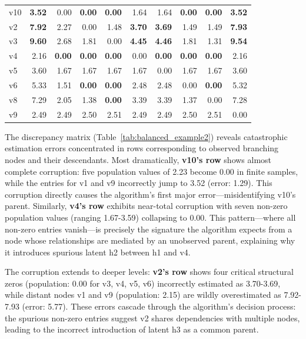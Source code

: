 \documentclass[11pt,a4paper]{article}
\numberwithin{equation}{section}
\begin{document}
\begin{table}[h]
\begin{tabular}{l|rrrrrrrrr}
v10 & \textbf{3.52} & 0.00 & \textbf{0.00} & \textbf{0.00} & 1.64 & 1.64 & \textbf{0.00} & \textbf{0.00} & \textbf{3.52} \\
v2 & \textbf{7.92} & 2.27 & 0.00 & 1.48 & \textbf{3.70} & \textbf{3.69} & 1.49 & 1.49 & \textbf{7.93} \\
v3 & \textbf{9.60} & 2.68 & 1.81 & 0.00 & \textbf{4.45} & \textbf{4.46} & 1.81 & 1.31 & \textbf{9.54} \\
v4 & 2.16 & \textbf{0.00} & \textbf{0.00} & \textbf{0.00} & 0.00 & \textbf{0.00} & \textbf{0.00} & \textbf{0.00} & 2.16 \\
v5 & 3.60 & 1.67 & 1.67 & 1.67 & 1.67 & 0.00 & 1.67 & 1.67 & 3.60 \\
v6 & 5.33 & 1.51 & \textbf{0.00} & \textbf{0.00} & 2.48 & 2.48 & 0.00 & \textbf{0.00} & 5.32 \\
v8 & 7.29 & 2.05 & 1.38 & \textbf{0.00} & 3.39 & 3.39 & 1.37 & 0.00 & 7.28 \\
v9 & 2.49 & 2.49 & 2.50 & 2.51 & 2.49 & 2.49 & 2.50 & 2.51 & 0.00 \\
\bottomrule
\end{tabular}
\end{table}

The discrepancy matrix (Table~\ref{tab:balanced_example2}) reveals catastrophic estimation errors concentrated in rows corresponding to observed branching nodes and their descendants. Most dramatically, \textbf{v10's row} shows almost complete corruption: five population values of 2.23 become 0.00 in finite samples, while the entries for v1 and v9 incorrectly jump to 3.52 (error: 1.29). This corruption directly causes the algorithm's first major error—misidentifying v10's parent. Similarly, \textbf{v4's row} exhibits near-total corruption with seven non-zero population values (ranging 1.67-3.59) collapsing to 0.00. This pattern—where all non-zero entries vanish—is precisely the signature the algorithm expects from a node whose relationships are mediated by an unobserved parent, explaining why it introduces spurious latent h2 between h1 and v4.

The corruption extends to deeper levels: \textbf{v2's row} shows four critical structural zeros (population: 0.00 for v3, v4, v5, v6) incorrectly estimated as 3.70-3.69, while distant nodes v1 and v9 (population: 2.15) are wildly overestimated as 7.92-7.93 (error: 5.77). These errors cascade through the algorithm's decision process: the spurious non-zero entries suggest v2 shares dependencies with multiple nodes, leading to the incorrect introduction of latent h3 as a common parent.
\end{document}
